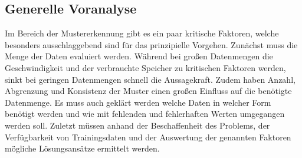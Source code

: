 \documentclass[12pt,a4paper,bibliography=totocnumbered,listof=totocnumbered]{scrartcl}
\begin{document}
\subsection{Generelle Voranalyse}
Im Bereich der Mustererkennung gibt es ein paar kritische Faktoren, welche besonders ausschlaggebend sind für das prinzipielle Vorgehen. Zunächst muss die Menge der Daten evaluiert werden. Während bei großen Datenmengen die Geschwindigkeit und der verbrauchte Speicher zu kritischen Faktoren werden, sinkt bei geringen Datenmengen schnell die Aussagekraft. Zudem haben Anzahl, Abgrenzung und Konsistenz der Muster einen großen Einfluss auf die benötigte Datenmenge. Es muss auch geklärt werden welche Daten in welcher Form benötigt werden und wie mit fehlenden und fehlerhaften Werten umgegangen werden soll. Zuletzt müssen anhand der Beschaffenheit des Problems, der Verfügbarkeit von Trainingsdaten und der Auswertung der genannten Faktoren mögliche Lösungsansätze ermittelt werden.

\end{document}
